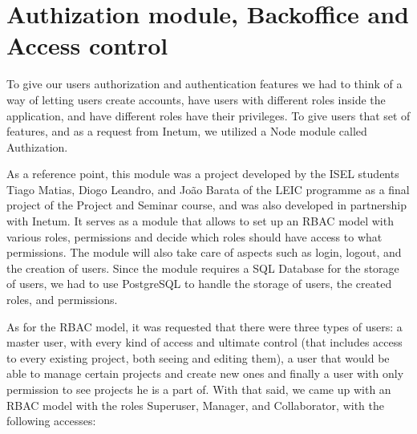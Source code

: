 \documentclass[a4paper,twoside,10pt]{report}
\begin{document}
\newpage
\section{Authization module, Backoffice and Access control}
 To give our users authorization and authentication features we had to think of a way of letting users create accounts, have users with different roles inside the application, and have different roles have their privileges. To give users that set of features, and as a request from Inetum, we utilized a Node module called Authization\cite{AUTHIZATION}. 

As a reference point, this module was a project developed by the ISEL students Tiago Matias, Diogo Leandro, and João Barata of the LEIC programme as a final project of the Project and Seminar course, and was also developed in partnership with Inetum. It serves as a module that allows to set up an RBAC model with various roles, permissions and decide which roles should have access to what permissions. The module will also take care of aspects such as login, logout, and the creation of users. Since the module requires a SQL Database for the storage of users, we had to use PostgreSQL\cite{POSTGRESQL} to handle the storage of users, the created roles, and permissions.

As for the RBAC model, it was requested that there were three types of users: a master user, with every kind of access and ultimate control (that includes access to every existing project, both seeing and editing them), a user that would be able to manage certain projects and create new ones and finally a user with only permission to see projects he is a part of.
With that said, we came up with an RBAC model with the roles Superuser, Manager, and Collaborator, with the following accesses:
 
\end{document}
